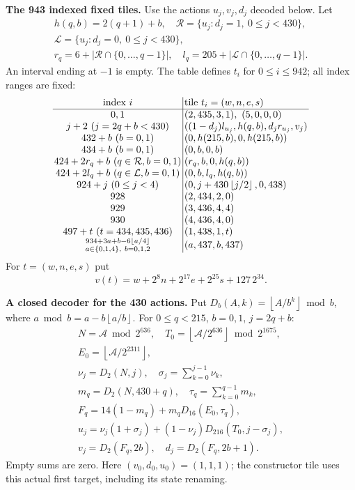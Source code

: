 \documentclass[11pt]{article}
\theoremstyle{remark}\newtheorem{remark}[theorem]{Remark}
\newcommand{\rg}[2]{\{#1,\ldots,#2\}}
\newcommand{\fl}[1]{\left\lfloor#1\right\rfloor}
\begin{document}
\textbf{The 943 indexed fixed tiles.}
Use the actions $u_j,v_j,d_j$ decoded below. Let
\[
\begin{gathered}
h(q,b)=2(q+1)+b,\quad
\mathcal R=\{u_j:d_j=1,\ 0\le j<430\},\\
\mathcal L=\{u_j:d_j=0,\ 0\le j<430\},\\
r_q=6+|\mathcal R\cap\rg0{q-1}|,\quad
l_q=205+|\mathcal L\cap\rg0{q-1}|.
\end{gathered}
\]
An interval ending at $-1$ is empty. The table defines $t_i$ for
$0\le i\le942$; all index ranges are fixed:
\[
\setlength{\arraycolsep}{1.4pt}\begin{array}{c|l}
\text{index }i&\text{tile }t_i=(w,n,e,s)\\\hline
0,1&(2,435,3,1),\ (5,0,0,0)\\
j+2\ (j=2q+b<430)&((1-d_j)l_{u_j},h(q,b),d_jr_{u_j},v_j)\\
432+b\ (b=0,1)&(0,h(215,b),0,h(215,b))\\
434+b\ (b=0,1)&(0,b,0,b)\\
424+2r_q+b\ (q\in\mathcal R,b=0,1)&(r_q,b,0,h(q,b))\\
424+2l_q+b\ (q\in\mathcal L,b=0,1)&(0,b,l_q,h(q,b))\\
924+j\ (0\le j<4)&(0,j+430\fl{j/2},0,438)\\
928&(2,434,2,0)\\
929&(3,436,4,4)\\
930&(4,436,4,0)\\
497+t\ (t=434,435,436)&(1,438,1,t)\\
\substack{934+3a+b-6\fl{a/4}\\a\in\{0,1,4\},\ b=0,1,2}&(a,437,b,437)
\end{array}
\]
For $t=(w,n,e,s)$ put
\[
v(t)=w+2^8n+2^{17}e+2^{25}s+127\,2^{34}.
\]

\textbf{A closed decoder for the 430 actions.}
Put $D_b(A,k)=\fl{A/b^k}\bmod b$, where
$a\bmod b=a-b\fl{a/b}$. For $0\le q<215$, $b=0,1$, $j=2q+b$:
\[
\begin{gathered}
N=\mathcal A\bmod2^{636},\quad
T_0=\fl{\mathcal A/2^{636}}\bmod2^{1675},\\
E_0=\fl{\mathcal A/2^{2311}},\\
\nu_j=D_2(N,j),\quad \sigma_j=\sum_{k=0}^{j-1}\nu_k,\\
m_q=D_2(N,430+q),\quad \tau_q=\sum_{k=0}^{q-1}m_k,\\
F_q=14(1-m_q)+m_qD_{16}(E_0,\tau_q),\\
u_j=\nu_j(1+\sigma_j)+(1-\nu_j)D_{216}(T_0,j-\sigma_j),\\
v_j=D_2(F_q,2b),\quad d_j=D_2(F_q,2b+1).
\end{gathered}
\]
Empty sums are zero. Here $(v_0,d_0,u_0)=(1,1,1)$; the constructor tile
uses this actual first target, including its state renaming.
\end{document}
